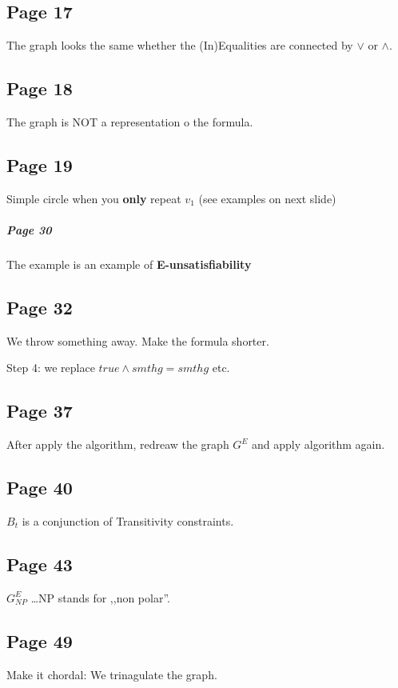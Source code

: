 \documentclass[a4paper]{article}
\begin{document}
\subsection{Page 17}
The graph looks the same whether the (In)Equalities are connected by $\vee$ or
$\wedge$.

\subsection{Page 18}
The graph is NOT a representation o the formula.

\subsection{Page 19}
Simple circle when you \textbf{only} repeat $v_1$ (see examples on next slide)


\subparagraph{Page 30}
The example is an example of \textbf{E-unsatisfiability}

\subsection{Page 32}

We throw something away. Make the formula shorter.

Step 4: we replace $true \wedge smthg = smthg$ etc.

\subsection{Page 37}
After apply the algorithm, redreaw the graph $G^E$ and apply algorithm again.

\subsection{Page 40}
$B_t$ is a conjunction of Transitivity constraints.

\subsection{Page 43}

$G_{NP}^E$ \ldots NP stands for ,,non polar''. 

\subsection{Page 49}

Make it chordal: We trinagulate the graph.
\end{document}
